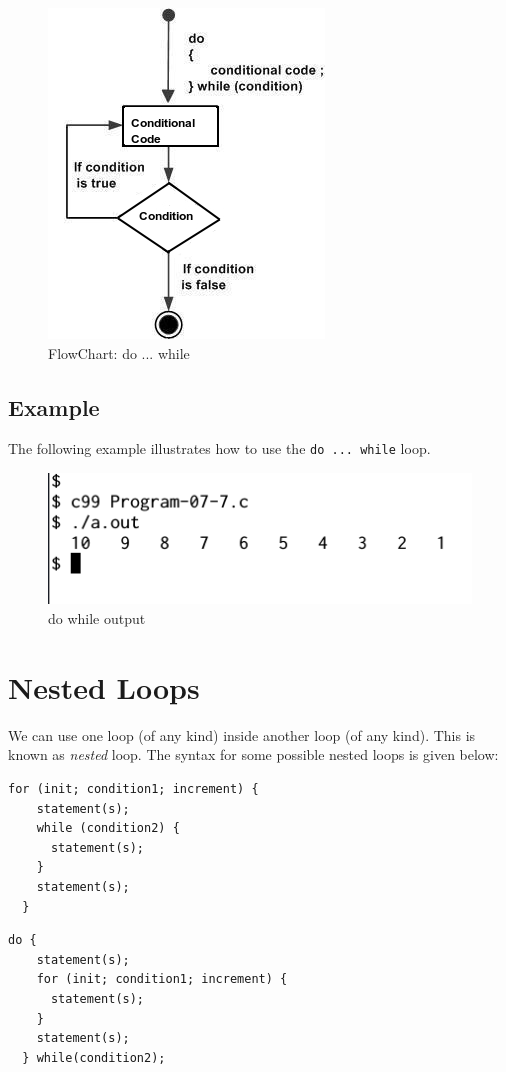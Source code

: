 \documentclass[11pt,a4paper]{article}
\begin{document}
\begin{figure}[ht]
\label{FlowChart do while}
\begin{center}
\includegraphics[scale=0.6]{dowhilefc.jpg}
\caption{FlowChart: do ... while}
\end{center}
\end{figure}

\subsection*{Example}
The following example illustrates how to use the \lstinline!do ... while! loop.

\begin{figure}[ht]
\caption{do while output}
\label{output-07-7}
\begin{center}
\includegraphics[scale=0.6]{Output-07-7.png}
\end{center}
\end{figure}

\section*{Nested Loops}
We can use one loop (of any kind) inside another loop (of any kind). This is known as \emph{nested} loop. The syntax for some possible nested loops is given below: 

\begin{lstlisting}[numbers=none]
  for (init; condition1; increment) {
    statement(s);
    while (condition2) {
      statement(s);
    }
    statement(s);
  }
\end{lstlisting}


\begin{lstlisting}[numbers=none]
  do {
    statement(s);
    for (init; condition1; increment) {
      statement(s);
    } 
    statement(s);
  } while(condition2);
\end{lstlisting}
\end{document}
